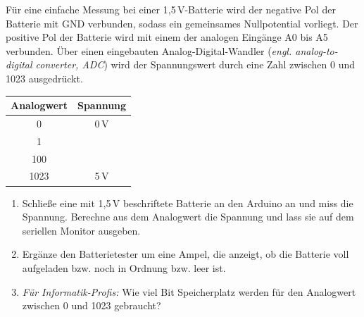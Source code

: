 \documentclass[ngerman, 11pt]{scrreprt}
\begin{document}
	\begin{projekt*}[Batterietester ($U<5\,V$)]
		\begin{minipage}{\textwidth}
			\begin{minipage}{0.68\textwidth}
				Für eine einfache Messung bei einer 1,5\,V-Batterie wird der negative Pol der Batterie mit GND verbunden, sodass ein gemeinsames Nullpotential vorliegt. Der positive Pol der Batterie wird mit einem der analogen Eingänge A0 bis A5 verbunden. Über einen eingebauten Analog-Digital-Wandler (\emph{engl. analog-to-digital converter, ADC}) wird der Spannungswert durch eine Zahl zwischen 0 und 1023 ausgedrückt.
			\end{minipage}
			\hfill
			\begin{minipage}{0.3\textwidth}
				\centering
				\begin{tabular}{c | c}
					\textbf{Analogwert} & \textbf{Spannung} \\ \hline
					0 & 0\,V \\ \hline
					1 &  \\ \hline
					100 &  \\ \hline
					1023 & 5\,V \\ \hline
				\end{tabular}
			\end{minipage}
		\end{minipage}
		\begin{enumerate}[label=\alph*), itemsep=0mm, parsep=0mm]
			\item Schließe eine mit 1,5\,V beschriftete Batterie an den Arduino an und miss die Spannung. Berechne aus dem Analogwert die Spannung und lass sie auf dem seriellen Monitor ausgeben.
			\item Ergänze den Batterietester um eine Ampel, die anzeigt, ob die Batterie voll aufgeladen bzw. noch in Ordnung bzw. leer ist.
			\item \emph{Für Informatik-Profis:} Wie viel Bit Speicherplatz werden für den Analogwert zwischen 0 und 1023 gebraucht?
		\end{enumerate}	
	\end{projekt*}
	
\end{document}
